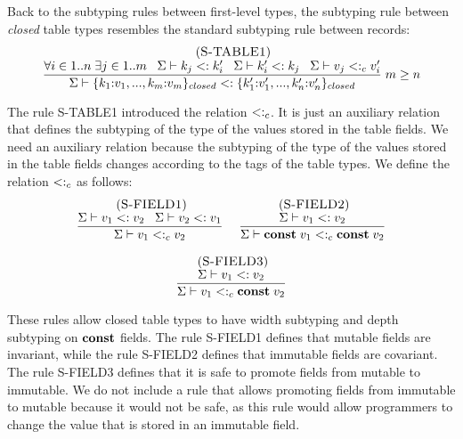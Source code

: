 Back to the subtyping rules between first-level types,
the subtyping rule between \emph{closed} table types resembles the
standard subtyping rule between records:
\[
\begin{array}{c}
\; (\textsc{S-TABLE1})\\
\dfrac{\forall i \in 1..n \; \exists j \in 1..m \;\;\;
       \Sigma \vdash k_{j} <: k_{i}' \;\;\;
       \Sigma \vdash k_{i}' <: k_{j} \;\;\;
       \Sigma \vdash v_{j} <:_{c} v_{i}'}
      {\Sigma \vdash \{k_{1}{:}v_{1}, ..., k_{m}{:}v_{m}\}_{closed} <: \{k_{1}'{:}v_{1}', ..., k_{n}'{:}v_{n}'\}_{closed}} \; m \ge n
\end{array}
\]

The rule \textsc{S-TABLE1} introduced the relation $<:_{c}$.
It is just an auxiliary relation that defines the subtyping of the
type of the values stored in the table fields.
We need an auxiliary relation because the subtyping of the
type of the values stored in the table fields changes according to
the tags of the table types.
We define the relation $<:_{c}$ as follows:
\[
\begin{array}{c}
\begin{array}{c}
\; (\textsc{S-FIELD1})\\
\dfrac{\Sigma \vdash v_{1} <: v_{2} \;\;\;
       \Sigma \vdash v_{2} <: v_{1}}
      {\Sigma \vdash v_{1} <:_{c} v_{2}}
\end{array}
\;
\begin{array}{c}
\; (\textsc{S-FIELD2})\\
\dfrac{\Sigma \vdash v_{1} <: v_{2}}
      {\Sigma \vdash \mathbf{const} \; v_{1} <:_{c} \mathbf{const} \; v_{2}}
\end{array}
\\ \\
\begin{array}{c}
\; (\textsc{S-FIELD3})\\
\dfrac{\Sigma \vdash v_{1} <: v_{2}}
      {\Sigma \vdash v_{1} <:_{c} \mathbf{const} \; v_{2}}
\end{array}
\end{array}
\]

These rules allow closed table types to have width subtyping
and depth subtyping on $\mathbf{const}$ fields.
The rule \textsc{S-FIELD1} defines that mutable fields are invariant,
while the rule \textsc{S-FIELD2} defines that immutable fields are covariant.
The rule \textsc{S-FIELD3} defines that it is safe to promote fields
from mutable to immutable.
We do not include a rule that allows promoting fields from immutable
to mutable because it would not be safe, as this rule would allow
programmers to change the value that is stored in an immutable field.


